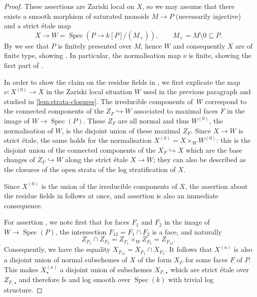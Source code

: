 \documentclass[a4paper,twoside,11pt,reqno]{amsart}
\newcommand{\inj}{\hookrightarrow}
\newcommand{\la}{\longrightarrow}
\DeclareMathOperator{\Spec}{Spec}
\theoremstyle{definition}
\numberwithin{equation}{subsection}
\begin{document}
\begin{proof}
These assertions are Zariski local on $X$, so we may assume that there exists a smooth morphism of saturated monoids $M\to P$ (necessarily injective) and a strict \'etale map  
\[ 
    X \la W = \Spec(P\to k[P]/(M_+)), \qquad M_+ = M\setminus 0 \subseteq P.
\]
By \cite[Corollary~2.5.18]{AHLS-Log} we see that $P$ is finitely presented over $M$, hence $W$ and consequently $X$ are of finite type, showing . In particular, the normalisation map $\nu$ is finite, showing the first part of  .

In order to show the claim on the residue fields in , we first explicate the map $\nu\colon X^{(0)}\to X$ in the Zariski local situation $W$ used in the previous paragraph and studied in \cref{lem:strata-closures}. 
The irreducible components of~$W$ correspond to the connected components of the $Z_F \inj W$ associated to maximal faces $F$ in the image of $W \to \Spec(P)$. These $Z_F$ are all normal and thus $W^{(0)}$, the normalisation of $W$, is the disjoint union of these maximal $Z_F$. Since $X \to W$ is strict \'etale, the same holds for the normalisation $X^{(0)} = X \times_W W^{(0)}$: this is the disjoint union of the connected components of the $X_F \inj X$ which are the base changes of $Z_F \inj W$ along the strict \'etale $X \to W$; they can also be described as the closures of the open strata of the log stratification of $X$.

Since $X^{(0)}$ is the union of the irreducible components of $X$, the assertion about the residue fields in  follows at once, and assertion  is also an immediate consequence. 

For assertion , we note first that for faces $F_1$ and $F_2$ in the image of $W \to \Spec(P)$, the intersection $F_{12} = F_1 \cap F_2$ is a face, and naturally 
\[
Z_{F_1} \cap Z_{F_2} = Z_{F_1} \times_W Z_{F_2} = Z_{F_{12}}.
\]
Consequently, we have the equality $X_{F_{12}} = X_{F_1} \cap X_{F_2}$. It follows that $X^{(a)}$ is also a disjoint union of normal subschemes of $X$ of the form $X_F$ for some faces $F$ of $P$. This makes $X^{(a)}_\star$ a disjoint union of subschemes $X_{F,\star}$ which are strict \'etale over $Z_{F,\star}$ and therefore fs and log smooth over $\Spec(k)$ with trivial log structure. 
 

\end{proof}
\end{document}
